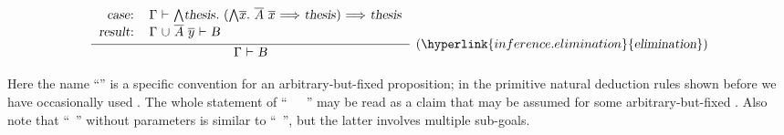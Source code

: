 \begin{isabellebody}
\begin{isamarkuptext}
  \[
  \infer[(\hyperlink{inference.elimination}{\mbox{\isa{elimination}}})]{\isa{{\isaliteral{22}{\isachardoublequote}}{\isaliteral{5C3C47616D6D613E}{\isasymGamma}}\ {\isaliteral{5C3C7475726E7374696C653E}{\isasymturnstile}}\ B{\isaliteral{22}{\isachardoublequote}}}}{
    \begin{tabular}{rl}
    \isa{{\isaliteral{22}{\isachardoublequote}}case{\isaliteral{3A}{\isacharcolon}}{\isaliteral{22}{\isachardoublequote}}} &
    \isa{{\isaliteral{22}{\isachardoublequote}}{\isaliteral{5C3C47616D6D613E}{\isasymGamma}}\ {\isaliteral{5C3C7475726E7374696C653E}{\isasymturnstile}}\ {\isaliteral{5C3C416E643E}{\isasymAnd}}thesis{\isaliteral{2E}{\isachardot}}\ {\isaliteral{28}{\isacharparenleft}}{\isaliteral{5C3C416E643E}{\isasymAnd}}\isaliteral{5C3C5E7665633E}{}\isactrlvec x{\isaliteral{2E}{\isachardot}}\ \isaliteral{5C3C5E7665633E}{}\isactrlvec A\ \isaliteral{5C3C5E7665633E}{}\isactrlvec x\ {\isaliteral{5C3C4C6F6E6772696768746172726F773E}{\isasymLongrightarrow}}\ thesis{\isaliteral{29}{\isacharparenright}}\ {\isaliteral{5C3C4C6F6E6772696768746172726F773E}{\isasymLongrightarrow}}\ thesis{\isaliteral{22}{\isachardoublequote}}} \\[0.2ex]
    \isa{{\isaliteral{22}{\isachardoublequote}}result{\isaliteral{3A}{\isacharcolon}}{\isaliteral{22}{\isachardoublequote}}} &
    \isa{{\isaliteral{22}{\isachardoublequote}}{\isaliteral{5C3C47616D6D613E}{\isasymGamma}}\ {\isaliteral{5C3C756E696F6E3E}{\isasymunion}}\ \isaliteral{5C3C5E7665633E}{}\isactrlvec A\ \isaliteral{5C3C5E7665633E}{}\isactrlvec y\ {\isaliteral{5C3C7475726E7374696C653E}{\isasymturnstile}}\ B{\isaliteral{22}{\isachardoublequote}}} \\[0.2ex]
    \end{tabular}}
  \]

  \noindent Here the name ``'' is a specific convention
  for an arbitrary-but-fixed proposition; in the primitive natural
  deduction rules shown before we have occasionally used .
  The whole statement of ``\hyperlink{command.obtain}{\mbox{}}~~\hyperlink{keyword.where}{\mbox{}}~'' may be read as a claim that 
  may be assumed for some arbitrary-but-fixed .  Also note
  that ``\hyperlink{command.obtain}{\mbox{}}~'' without parameters
  is similar to ``\hyperlink{command.have}{\mbox{}}~'', but the
  latter involves multiple sub-goals.


\end{isamarkuptext}
\end{isabellebody}
